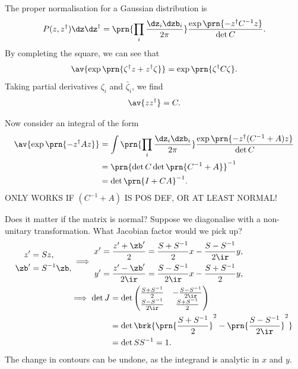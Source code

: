 \documentclass[12pt]{article}
\newcommand{\inv}{^{-1}}
\newcommand{\dg}{^\dagger}
\begin{document}
The proper normalisation for a Gaussian distribution is
%
\begin{equation}\label{eq:compgaussnorm}
  P(z,z\dg)\dz\dz\dg = \prn{\prod_i\frac{\dz_i\dzb_i}{2\pi}} \frac{\exp\prn{-z\dg C\inv z}}{\det C}.
\end{equation}
%
By completing the square, we can see that
%
\begin{equation}\label{eq:compgausslin}
  \av{\exp\prn{\zeta\dg z + z\dg\zeta}} = \exp\prn{\zeta\dg C\zeta}.
\end{equation}
%
Taking partial derivatives \wrt $\zeta_i$ and $\bar{\zeta}_i$, we find
%
\begin{equation}\label{eq:compgauscov}
  \av{zz\dg} = C.
\end{equation}
%

Now consider an integral of the form
%
\begin{equation}\label{eq:compgaussquad}
\begin{aligned}
  \av{\exp\prn{-z\dg A z}} &=
    \int \prn{\prod_i\frac{\dz_i\dzb_i}{2\pi}}\frac{\exp\prn{-z\dg (C\inv+A) z}}{\det C} \\
    &= \prn{\det C\det\prn{C\inv+A}}\inv \\
    &= \det\prn{I+CA}\inv.
\end{aligned}
\end{equation}
%
ONLY WORKS IF $(C\inv+A)$ IS POS DEF, OR AT LEAST NORMAL!

Does it matter if the matrix is normal?
Suppose we diagonalise with a non-unitary transformation.
What Jacobian factor would we pick up?
%
\begin{equation*}
\begin{aligned}
  \begin{aligned}
    z'   &= Sz, \\
    \zb' &=S\inv\zb,
  \end{aligned}
  &\implies
  \begin{aligned}
    x' &= \frac{z'+\zb'}{2}    = \frac{S+S\inv}{2}x - \frac{S-S\inv}{2\ir}y, \\
    y' &= \frac{z'-\zb'}{2\ir} = \frac{S-S\inv}{2\ir}x - \frac{S+S\inv}{2}y,
  \end{aligned}
  \\ &
  \begin{aligned}
  \implies  \det J &= \det\begin{pmatrix}
                    \frac{S+S\inv}{2}    & -\frac{S-S\inv}{2\ir} \\
                    \frac{S-S\inv}{2\ir} & \frac{S+S\inv}{2} \\
                  \end{pmatrix}
     \\
     &= \det \brk{\prn{\frac{S+S\inv}{2}}^2-\prn{\frac{S-S\inv}{2\ir}}^2}\\
     &=\det S S\inv = 1.
  \end{aligned}
\end{aligned}
\end{equation*}
%
The change in contours can be undone, as the integrand is analytic in $x$ and $y$.
\end{document}
